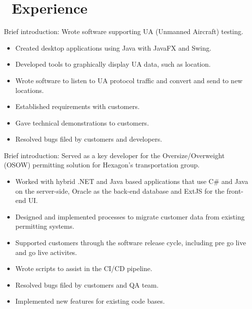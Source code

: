 \documentclass{resume}
\begin{document}



\section{\faUsers\ Experience}
\role{Computer Analyst 3}

Brief introduction: Wrote software supporting UA (Unmanned Aircraft) testing.
\begin{itemize}
  \item Created desktop applications using Java with JavaFX and Swing.
  \item Developed tools to graphically display UA data, such as location.
  \item Wrote software to listen to UA protocol traffic and convert and send to new locations.
  \item Established requirements with customers.
  \item Gave technical demonstrations to customers.
  \item Resolved bugs filed by customers and developers.
\end{itemize}


Brief introduction: Served as a key developer for the Oversize/Overweight (OSOW) permitting solution for Hexagon's transportation group.
\begin{itemize}
  \item Worked with hybrid .NET and Java based applications that use C\# and Java on the server-side, Oracle as the back-end database and ExtJS for the front-end UI.
  \item Designed and implemented processes to migrate customer data from existing permitting systems.
  \item Supported customers through the software release cycle, including pre go live and go live activites.
  \item Wrote scripts to assist in the CI/CD pipeline.
  \item Resolved bugs filed by customers and QA team.
  \item Implemented new features for existing code bases.
\end{itemize}
\end{document}
